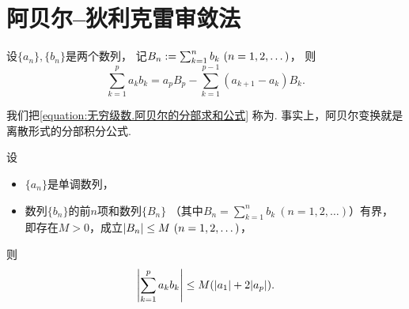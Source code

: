 \section{阿贝尔--狄利克雷审敛法}
\begin{lemma}[阿贝尔变换]
设\(\{a_n\},\{b_n\}\)是两个数列，
记\(B_n \defeq \sum_{k=1}^n b_k\ (n=1,2,\dotsc)\)，
则\begin{equation}\label{equation:无穷级数.阿贝尔的分部求和公式}
	\sum_{k=1}^p a_k b_k
	= a_p B_p - \sum_{k=1}^{p-1} (a_{k+1} - a_k) B_k.
\end{equation}
\end{lemma}
我们把\cref{equation:无穷级数.阿贝尔的分部求和公式} 称为.
事实上，阿贝尔变换就是离散形式的分部积分公式.

\begin{lemma}\label{theorem:无穷级数.阿贝尔引理}
设\begin{itemize}
	\item \(\{a_n\}\)是单调数列，
	\item 数列\(\{b_n\}\)的前\(n\)项和数列\(\{B_n\}\)
	（其中\(B_n = \sum_{k=1}^n b_k\ (n=1,2,\dotsc)\)）有界，
	即存在\(M>0\)，成立\(\abs{B_n} \leq M\ (n=1,2,\dotsc)\)，
\end{itemize}
则\[
	\abs{\sum_{k=1}^p a_k b_k}
	\leq M(\abs{a_1} + 2 \abs{a_p}).
\]
\end{lemma}

